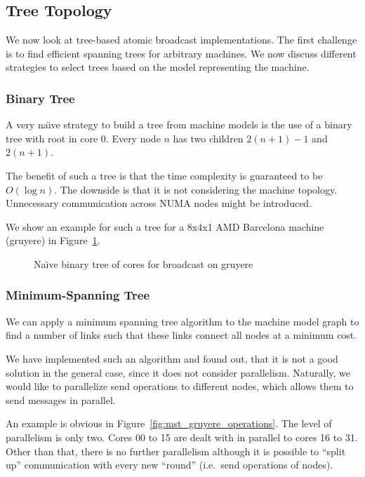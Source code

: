 \documentclass{article}
\newcommand{\naive}{na\"{\i}ve\xspace}
\newcommand{\Naive}{Na\"{\i}ve\xspace}
\begin{document}
\subsection{Tree Topology}

We now look at tree-based atomic broadcast implementations. The first
challenge is to find efficient spanning trees for arbitrary
machines. We now discuss different strategies to select trees based on
the model representing the machine.

\subsubsection{Binary Tree}

A very \naive strategy to build a tree from machine models is the use
of a binary tree with root in core 0. Every node $n$ has two children
$2(n+1)-1$ and $2(n+1)$.

The benefit of such a tree is that the time complexity is guaranteed
to be $O(\log{n})$. The downside is that it is not considering the
machine topology. Unnecessary communication across NUMA nodes might be
introduced. 

We show an example for such a tree for a 8x4x1 AMD Barcelona machine
(gruyere) in Figure~\ref{fig:qrm_tree_gruyere}.

\begin{figure}
  
  \caption{\Naive binary tree of cores for broadcast on gruyere}
  \label{fig:qrm_tree_gruyere}
\end{figure}

\subsubsection{Minimum-Spanning Tree}
\label{sec:mst_tree}

We can apply a minimum spanning tree algorithm to the machine model
graph to find a number of links such that these links connect all
nodes at a minimum cost.

We have implemented such an algorithm and found out, that it is not a
good solution in the general case, since it does not consider
parallelism. Naturally, we would like to parallelize send operations
to different nodes, which allows them to send messages in parallel. 

An example is obvious in Figure~\ref{fig:mst_gruyere_operations}. The
level of parallelism is only two. Cores 00 to 15 are dealt with in
parallel to cores 16 to 31. Other than that, there is no further
parallelism although it is possible to ``split up'' communication with
every new ``round'' (i.e.\ send operations of nodes).
\end{document}
